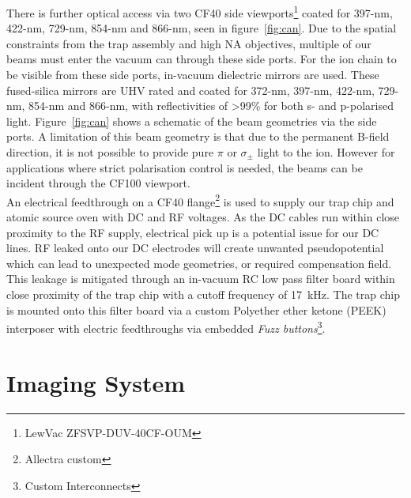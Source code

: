     There is further optical access via
    two CF40 side viewports\footnote{LewVac ZFSVP-DUV-40CF-OUM} coated
    for 397-nm, 422-nm, 729-nm, 854-nm and 866-nm, seen in figure~\ref{fig:can}.  Due to the spatial
    constraints from the trap assembly and high NA objectives, 
    multiple of our beams must enter the vacuum can through these side ports. For the ion chain to be visible from these side ports, in-vacuum dielectric
    mirrors are used. These fused-silica mirrors are UHV rated and coated for 372-nm, 397-nm,
    422-nm, 729-nm, 854-nm and 866-nm, with reflectivities of >99\% for both s-
    and p-polarised light. Figure~\ref{fig:can} shows a schematic of the beam
    geometries via the side ports. A limitation of this beam geometry is that due to the permanent B-field direction, it is not possible to provide pure $\pi$ or $\sigma_{\pm}$ light to the ion. However for applications where strict polarisation control is needed, the beams can be incident through the CF100 viewport.\\
    An electrical feedthrough on a CF40 flange\footnote{Allectra custom} is used to supply our trap chip and atomic source oven with DC and RF voltages. As
    the DC cables run within close proximity to the RF supply, electrical pick
    up is a potential issue for our DC lines. RF leaked onto our DC electrodes
    will create unwanted pseudopotential which can lead to unexpected mode
    geometries, or required compensation field. This leakage is mitigated through
    an in-vacuum RC low pass filter board within close proximity of the trap
    chip with a cutoff frequency of 17~kHz. The trap chip is mounted onto this
    filter board via a custom Polyether ether ketone (PEEK) interposer with
    electric feedthroughs via embedded \emph{Fuzz buttons}\footnote{Custom
    Interconnects}. \\

\section{Imaging System}
\label{sec:Imaging System}

